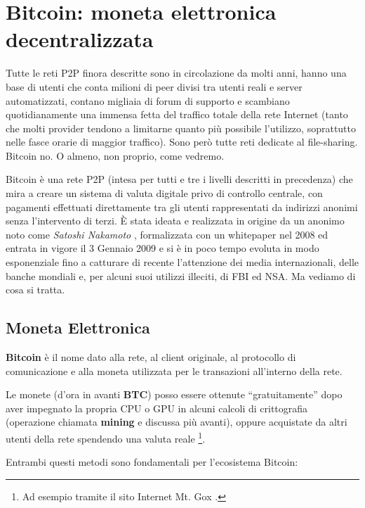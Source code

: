 \chapter{Bitcoin: moneta elettronica decentralizzata}\label{bitcoin-moneta-elettronica-decentralizzata}

Tutte le reti P2P finora descritte sono in circolazione da molti anni, hanno una base di utenti che conta milioni di peer divisi tra utenti reali e server automatizzati, contano migliaia di forum di supporto e scambiano quotidianamente una immensa fetta del traffico totale della rete Internet (tanto che molti provider tendono a limitarne quanto più possibile l'utilizzo, soprattutto nelle fasce orarie di maggior traffico). Sono però tutte reti dedicate al file-sharing. Bitcoin no. O almeno, non proprio, come vedremo.

Bitcoin è una rete P2P (intesa per tutti e tre i livelli descritti in precedenza) che mira a creare un sistema di valuta digitale privo di controllo centrale, con pagamenti effettuati direttamente tra gli utenti rappresentati da indirizzi anonimi senza l'intervento di terzi. È stata ideata e realizzata in origine da un anonimo noto come \emph{Satoshi Nakamoto} \cite{bitcoin}, formalizzata con un whitepaper nel 2008 ed entrata in vigore il 3 Gennaio 2009 e si è in poco tempo evoluta in modo esponenziale fino a catturare di recente l'attenzione dei media internazionali, delle banche mondiali e, per alcuni suoi utilizzi illeciti, di FBI ed NSA. Ma vediamo di cosa si tratta.

\section{Moneta Elettronica}\label{moneta-elettronica}

\textbf{Bitcoin} è il nome dato alla rete, al client originale, al protocollo di comunicazione e alla moneta utilizzata per le transazioni all'interno della rete.

Le monete (d'ora in avanti \textbf{BTC}) posso essere ottenute ``gratuitamente'' dopo aver impegnato la propria CPU o GPU in alcuni calcoli di crittografia (operazione chiamata \textbf{mining} e discussa più avanti), oppure acquistate da altri utenti della rete spendendo una valuta reale \footnote{Ad esempio tramite il sito Internet Mt. Gox   \cite{mtgox}.}.

Entrambi questi metodi sono fondamentali per l'ecosistema Bitcoin:

